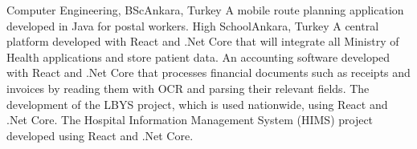 \documentclass[
    10pt,
    A4,
    english,
    draft = false,
    twoside = false,
]{article}
\begin{document}

	{Computer Engineering, BSc}{Ankara, Turkey}
    {
      {A mobile route planning application developed in Java for postal workers.}
    }
	{High School}{Ankara, Turkey}{}
    {
      {A central platform developed with React and .Net Core that will integrate all Ministry of Health applications and store patient data.}
      {An accounting software developed with React and .Net Core that processes financial documents such as receipts and invoices by reading them with OCR and parsing their relevant fields.}
    }
    {
      {The development of the LBYS project, which is used nationwide, using React and .Net Core.}
      {The Hospital Information Management System (HIMS) project developed using React and .Net Core.}
    }
\end{document}
